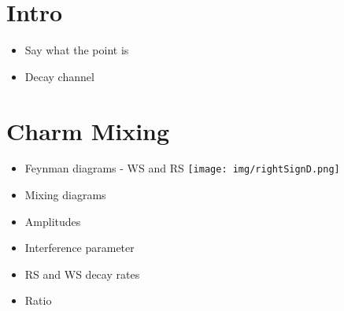 \documentclass[note.tex]{subfiles}
\begin{document}
\section{Intro}
\begin{itemize}
    \item Say what the point is
    \item Decay channel
\end{itemize}

\section{Charm Mixing}
\begin{itemize}
    \item Feynman diagrams - WS and RS
    \texttt{[image: img/rightSignD.png]}
    \item Mixing diagrams
    \item Amplitudes
    \item Interference parameter
    \item RS and WS decay rates
    \item Ratio
\end{itemize}
\end{document}
